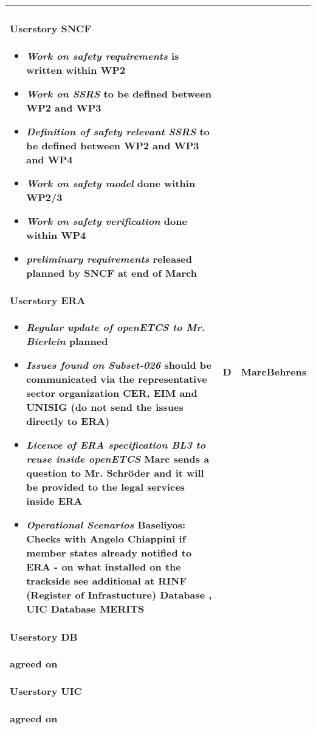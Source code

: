 \documentclass[a4paper]{article}
\begin{document}
\begin{longtable}{|p{}|p{}|p{}|}
\paragraph{Userstory SNCF}
\begin{itemize}
	\item \emph{Work on safety requirements} is written within WP2
	\item \emph{Work on SSRS} to be defined between WP2 and WP3
	\item \emph{Definition of safety relevant SSRS} to be defined between WP2 and WP3 and WP4
	\item \emph{Work on safety model} done within WP2/3
	\item \emph{Work on safety verification} done within WP4
	\item \emph{preliminary requirements} released planned by SNCF at end of March
\end{itemize}

\paragraph{Userstory ERA}
\begin{itemize}
	\item \emph{Regular update of openETCS to Mr. Bierlein} planned
	\item \emph{Issues found on Subset-026} should be communicated via the representative sector organization CER, EIM and UNISIG (do not send the issues directly to ERA)
	\item \emph{Licence of ERA specification BL3 to reuse inside openETCS} Marc sends a question to Mr. Schr\"{o}der and it will be provided to the legal services inside ERA
	\item \emph{Operational Scenarios} Baseliyos: Checks with Angelo Chiappini if member states already notified to ERA - on what installed on the trackside see additional at RINF (Register of Infrastucture) Database , UIC Database MERITS 
\end{itemize}

\paragraph{Userstory DB} agreed on

\paragraph{Userstory UIC} agreed on

& D
& Marc\newline Behrens
\\\hline
\end{longtable}
\end{document}
